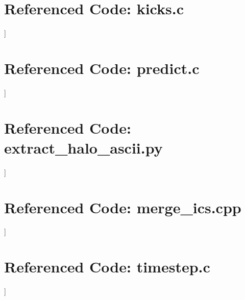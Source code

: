 \appendix



\chapter{Referenced Code: kicks.c} \label{ch:kicks.c}
]

\chapter{Referenced Code: predict.c} \label{ch:predict.c}
]


\chapter{Referenced Code: extract\_halo\_ascii.py} \label{ch:extract_halo_ascii.py}
]
    
    
\chapter{Referenced Code: merge\_ics.cpp} \label{ch:merge_ics.cpp}
]
    
\chapter{Referenced Code: timestep.c} \label{ch:timestep.c}
]